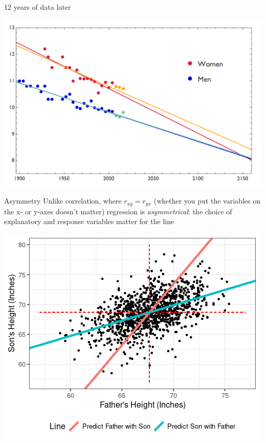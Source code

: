 \documentclass{beamer}
\begin{document}
\begin{frame}{12 years of data later}
\begin{center}
\includegraphics[scale=0.4]{nature_update.png}
\end{center}
\end{frame}

\begin{frame}{Asymmetry}
Unlike correlation, where $r_{xy} = r_{yx}$ (whether you put the variables on the x- or y-axes doesn't matter) regression is \textit{asymmetrical}: the choice of explanatory and response variables matter for the line
\begin{center}
\includegraphics[scale=0.45]{father_son_lm2.png}
\end{center}
\end{frame}
\end{document}
